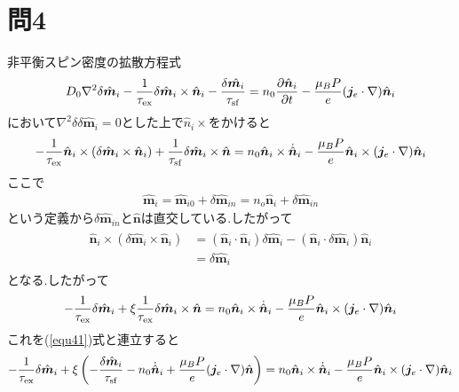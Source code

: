 \documentclass[uplatex,a4j,11pt,dvipdfmx]{jsarticle}
\begin{document}
\section*{問4}
非平衡スピン密度の拡散方程式
\begin{align}
  \label{equ41}
  D_0\nabla^2\delta\hat{\bm m}_i-\frac{1}{\tau_{\rm ex}}\delta\hat{\bm m}_i\times\hat{\bm n}_i-\frac{\delta\hat{\bm m_i}}{\tau_{\rm sf}}
  =n_0\frac{\partial\hat{\bm n}_i}{\partial t}-\frac{\mu_BP}{e}({\bm j}_e\cdot\nabla)\hat{\bm n}_i
\end{align}
において$\nabla^2\delta\delta\hat{\bm m}_i=0$とした上で$\hat{n}_i\times$をかけると
\begin{align}
  -\frac{1}{\tau_{\rm ex}}\hat{\bm n}_i\times(\delta\hat{\bm m}_i\times\hat{\bm n}_i)+\frac{1}{\tau_{\rm sf}}\delta\hat{\bm m}_i\times\hat{\bm n}
  =n_0\hat{\bm n}_i\times\dot{\hat{\bm n}}_i-\frac{\mu_BP}{e}\hat{\bm n}_i\times({\bm j}_e\cdot\nabla)\hat{\bm n}_i
\end{align}
ここで
\begin{align}
  \label{equ42}
  \hat{\bm m}_i=\hat{\bm m}_{i0}+\delta\hat{\bm m}_{in}=n_o\hat{\bm n}_i+\delta\hat{\bm m}_{in}
\end{align}
という定義から$\delta\hat{\bm m}_{in}$と$\hat{\bm n}$は直交している.したがって
\begin{align}
  \begin{split}
    \hat{\bm n}_i\times(\delta\hat{\bm m}_i\times\hat{\bm n}_i)&=
    (\hat{\bm n}_i\cdot\hat{\bm n}_i)\delta\hat{\bm m}_i-(\hat{\bm n}_i\cdot\delta\hat{\bm m}_i)\hat{\bm n}_i\\
    &=\delta\hat{\bm m}_i
  \end{split}
\end{align}
となる.したがって
\begin{align}
  -\frac{1}{\tau_{\rm ex}}\delta\hat{\bm m}_i+\xi\frac{1}{\tau_{\rm ex}}\delta\hat{\bm m}_i\times\hat{\bm n}
  =n_0\hat{\bm n}_i\times\dot{\hat{\bm n}}_i-\frac{\mu_BP}{e}\hat{\bm n}_i\times({\bm j}_e\cdot\nabla)\hat{\bm n}_i
\end{align}
これを(\ref{equ41})式と連立すると
\begin{align*}
  \begin{split}
    -\frac{1}{\tau_{\rm ex}}\delta\hat{\bm m}_i
    +\xi\left(-\frac{\delta\hat{\bm m}_i}{\tau_{\rm sf}}-n_0\dot{\hat{\bm n}}_i+\frac{\mu_BP}{e}({\bm j}_e\cdot\nabla)\hat{\bm n}\right)
    =n_0\hat{\bm n}_i\times\dot{\hat{\bm n}}_i-\frac{\mu_BP}{e}\hat{\bm n}_i\times({\bm j}_e\cdot\nabla)\hat{\bm n}_i\\
  \end{split}
\end{align*}
\end{document}

